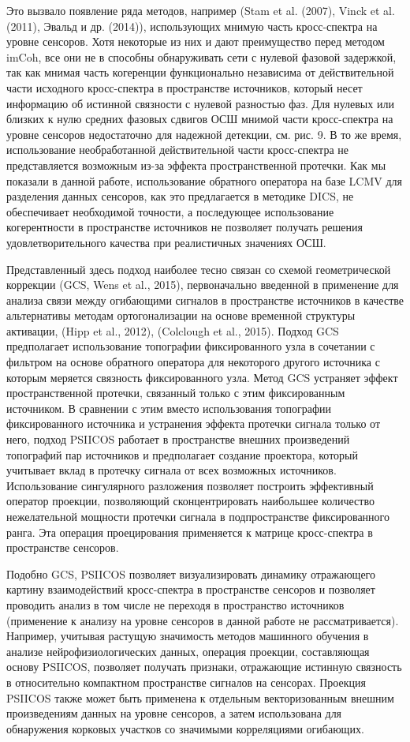Это вызвало появление ряда методов, например (Stam et al. (2007), Vinck et al.
(2011), Эвальд и др. (2014)), использующих мнимую часть кросс-спектра на уровне
сенсоров.  Хотя некоторые из них и дают преимущество перед методом imCoh, все
они не в способны обнаруживать сети с нулевой фазовой задержкой, так как мнимая
часть когеренции функционально независима от действительной части исходного
кросс-спектра в пространстве источников, который несет информацию об истинной
связности с нулевой разностью фаз. Для нулевых или близких к нулю средних
фазовых сдвигов ОСШ мнимой части кросс-спектра на уровне сенсоров недостаточно
для надежной детекции, см. рис. 9. В то же время, использование необработанной
действительной части кросс-спектра не представляется возможным из-за эффекта
пространственной протечки. Как мы показали в данной работе, использование
обратного оператора на базе LCMV для разделения данных сенсоров, как это
предлагается в методике DICS, не обеспечивает необходимой точности, а
последующее использование когерентности в пространстве
источников не позволяет получать решения удовлетворительного качества при
реалистичных значениях ОСШ.

Представленный здесь подход наиболее тесно связан со схемой геометрической
коррекции (GCS, Wens et al., 2015), первоначально введенной в применение для
анализа связи между огибающими сигналов в пространстве источников в качестве
альтернативы методам ортогонализации на основе временной структуры активации,
(Hipp et al., 2012), (Colclough et al., 2015). Подход GCS предполагает
использование топографии фиксированного узла в сочетании с фильтром на основе
обратного оператора для некоторого другого источника с которым меряется
связность фиксированного узла. Метод GCS устраняет эффект пространственной
протечки, связанный только с этим фиксированным источником.  В сравнении с этим
вместо использования топографии фиксированного источника и устранения эффекта
протечки сигнала только от него, подход PSIICOS работает в пространстве внешних
произведений топографий пар источников и предполагает создание проектора,
который учитывает вклад в протечку сигнала от всех возможных источников.
Использование сингулярного разложения позволяет построить эффективный оператор
проекции, позволяющий сконцентрировать наибольшее количество нежелательной
мощности протечки сигнала в подпространстве фиксированного ранга. Эта операция
проецирования применяется к матрице кросс-спектра в пространстве сенсоров.

Подобно GCS, PSIICOS позволяет визуализировать динамику отражающего картину
взаимодействий кросс-спектра в пространстве сенсоров и позволяет проводить анализ
в том числе не переходя в пространство источников (применение к анализу на уровне сенсоров
в данной работе не рассматривается). Например,
учитывая растущую значимость методов машинного обучения в анализе
нейрофизиологических данных, операция проекции, составляющая основу PSIICOS,
позволяет получать признаки, отражающие истинную связность в
относительно компактном пространстве сигналов на сенсорах. Проекция PSIICOS также
может быть применена к отдельным векторизованным внешним произведениям
данных на уровне сенсоров, а затем использована для обнаружения корковых участков со
значимыми корреляциями огибающих.

